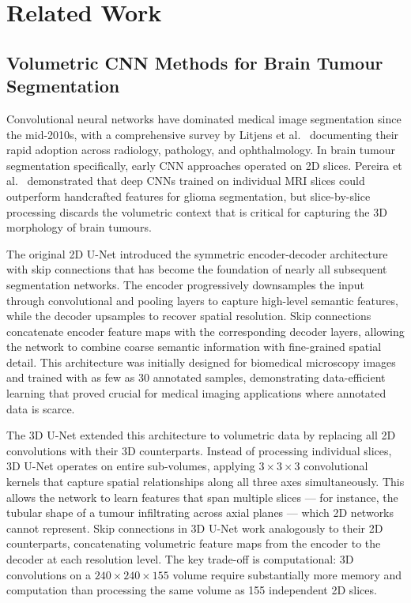 \documentclass{article}
\begin{document}
\section{Related Work}
\label{sec:related}

\subsection{Volumetric CNN Methods for Brain Tumour Segmentation}

Convolutional neural networks have dominated medical image segmentation since
the mid-2010s, with a comprehensive survey by Litjens et al.\
\cite{litjens2017survey} documenting their rapid adoption across radiology,
pathology, and ophthalmology. In brain tumour segmentation specifically, early
CNN approaches operated on 2D slices. Pereira et al.\ \cite{pereira2016brain}
demonstrated that deep CNNs trained on individual MRI slices could outperform
handcrafted features for glioma segmentation, but slice-by-slice processing
discards the volumetric context that is critical for capturing the 3D morphology
of brain tumours.

The original 2D U-Net \cite{ronneberger2015unet} introduced the symmetric
encoder-decoder architecture with skip connections that has become the foundation
of nearly all subsequent segmentation networks. The encoder progressively
downsamples the input through convolutional and pooling layers to capture
high-level semantic features, while the decoder upsamples to recover spatial
resolution. Skip connections concatenate encoder feature maps with the
corresponding decoder layers, allowing the network to combine coarse semantic
information with fine-grained spatial detail. This architecture was initially
designed for biomedical microscopy images and trained with as few as 30 annotated
samples, demonstrating data-efficient learning that proved crucial for medical
imaging applications where annotated data is scarce.

The 3D U-Net \cite{cicek20163d} extended this architecture to volumetric data by
replacing all 2D convolutions with their 3D counterparts. Instead of processing
individual slices, 3D U-Net operates on entire sub-volumes, applying
$3 \times 3 \times 3$ convolutional kernels that capture spatial relationships
along all three axes simultaneously. This allows the network to learn features
that span multiple slices --- for instance, the tubular shape of a tumour
infiltrating across axial planes --- which 2D networks cannot represent. Skip
connections in 3D U-Net work analogously to their 2D counterparts, concatenating
volumetric feature maps from the encoder to the decoder at each resolution level.
The key trade-off is computational: 3D convolutions on a
$240 \times 240 \times 155$ volume require substantially more memory and
computation than processing the same volume as 155 independent 2D slices.
\end{document}
